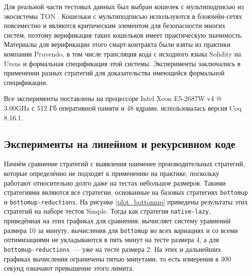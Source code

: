 \documentclass[../thesis.tex]{subfiles}
\begin{document}
Для реальной части тестовых данных был выбран кошелек с мультиподписью из экосистемы TON \cite{multisig}. Кошельки с мультиподписью используются в блокчейн-сетях повсеместно \cite{wallets_survey} и являются критическим элементом для безопасности многих систем, поэтому верификация таких кошельков имеет практическую значимость. Материалы для верификации этого смарт-контракта были взяты из практики компании Pruvendo, в том числе трансляция кода с исходного языка Solidity на Ursus и формальная спецификация этой системы. Эксперименты заключались в применении разных стратегий для доказательства имеющейся формальной спецификации.

Все эксперименты поставлены на процессоре Intel Xeon E5-2687W v4 @ 3.00GHz с 512 Гб оперативной памяти и 48 ядрами, использовалась версия Coq 8.16.1.

\subsection{Эксперименты на линейном и рекурсивном коде}\label{main_results}

Начнём сравнение стратегий с выявления наименее производительных стратегий, которые определённо не подходят к применению на практике, поскольку работают относительно долго даже на тестах небольшое размеров. Такими стратегиями являются все стратегии, основанные на базовых стратегиях \texttt{bottomup} и \texttt{bottomup-reductions}. На рисунке \ref{plot_bottomup} приведены результаты этих стратегий на наборе тестов Simple. Тогда как стратегия \texttt{native-lazy}, приведённая на этих графиках для сравнения, вычисляет систему уравнений размера 10 за минуту, вычисления для \texttt{bottomup} во всех вариациях и со всеми оптимизациями не укладываются в пять минут на тесте размера 4, а для \texttt{bottomup-reductions}~--- уже на тесте размера 2. На этих и дальнейших графиках вычисления ограничены пятью минутами, то есть измерения в 300 секунд означают превышение этого лимита. 

\graphicspath{ {../images/} }
\end{document}
